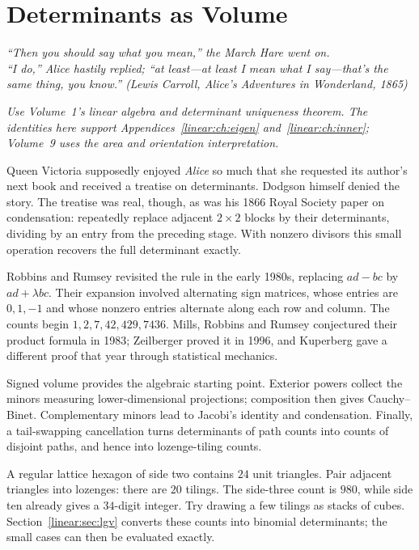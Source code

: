 \chapter{Determinants as Volume}\label{linear:ch:volume}

\begin{center}\itshape
``Then you should say what you mean,'' the March Hare went on.\\
``I do,'' Alice hastily replied; ``at least---at least I mean what I say---that's the same thing, you know.''
\upshape(Lewis Carroll, \emph{Alice's Adventures in Wonderland}, 1865)
\end{center}
\noindent\emph{Use Volume~1's linear algebra and determinant uniqueness theorem. The identities here support Appendices~\ref{linear:ch:eigen} and~\ref{linear:ch:inner}; Volume~9 uses the area and orientation interpretation.}

Queen Victoria supposedly enjoyed \emph{Alice} so much that she requested its author's next book and received a treatise on determinants. Dodgson himself denied the story. The treatise was real, though, as was his 1866 Royal Society paper on condensation: repeatedly replace adjacent $2\times2$ blocks by their determinants, dividing by an entry from the preceding stage. With nonzero divisors this small operation recovers the full determinant exactly.

Robbins and Rumsey revisited the rule in the early 1980s, replacing $ad-bc$ by $ad+\lambda bc$. Their expansion involved alternating sign matrices, whose entries are $0,1,-1$ and whose nonzero entries alternate along each row and column. The counts begin $1,2,7,42,429,7436$. Mills, Robbins and Rumsey conjectured their product formula in 1983; Zeilberger proved it in 1996, and Kuperberg gave a different proof that year through statistical mechanics.

Signed volume provides the algebraic starting point. Exterior powers collect the minors measuring lower-dimensional projections; composition then gives Cauchy--Binet. Complementary minors lead to Jacobi's identity and condensation. Finally, a tail-swapping cancellation turns determinants of path counts into counts of disjoint paths, and hence into lozenge-tiling counts.

\begin{think}
A regular lattice hexagon of side two contains $24$ unit triangles. Pair adjacent triangles into lozenges: there are $20$ tilings. The side-three count is $980$, while side ten already gives a $34$-digit integer. Try drawing a few tilings as stacks of cubes. Section~\ref{linear:sec:lgv} converts these counts into binomial determinants; the small cases can then be evaluated exactly.
\end{think}

